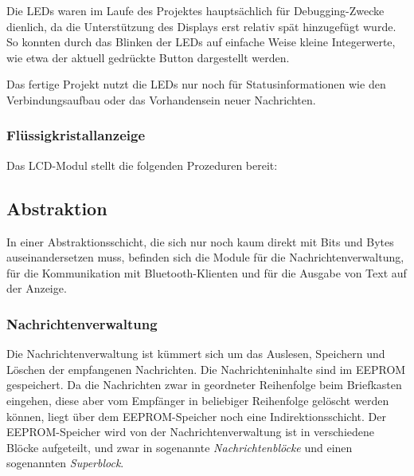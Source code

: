 \documentclass[ngerman]{article}
\begin{document}
Die LEDs waren im Laufe des Projektes hauptsächlich für Debugging-Zwecke
dienlich, da die Unterstützung des Displays erst relativ spät hinzugefügt
wurde. So konnten durch das Blinken der LEDs auf einfache Weise kleine
Integerwerte, wie etwa der aktuell gedrückte Button dargestellt werden.

Das fertige Projekt nutzt die LEDs nur noch für Statusinformationen
wie den Verbindungsaufbau oder das Vorhandensein neuer Nachrichten.

\subsubsection{Flüssigkristallanzeige}

Das LCD-Modul stellt die folgenden Prozeduren bereit:




\subsection{Abstraktion}

In einer Abstraktionsschicht, die sich nur noch kaum direkt mit Bits und Bytes
auseinandersetzen muss, befinden sich die Module für die Nachrichtenverwaltung,
für die Kommunikation mit Bluetooth-Klienten und für die Ausgabe von Text auf
der Anzeige.


\subsubsection{Nachrichtenverwaltung}

Die Nachrichtenverwaltung ist kümmert sich um das Auslesen, Speichern und
Löschen der empfangenen Nachrichten. Die Nachrichteninhalte sind im EEPROM
gespeichert.  Da die Nachrichten zwar in geordneter Reihenfolge beim
Briefkasten eingehen, diese aber vom Empfänger in beliebiger Reihenfolge
gelöscht werden können, liegt über dem EEPROM-Speicher noch eine
In\-di\-rek\-tions\-schicht. Der EEPROM-Speicher wird von der
Nachrichtenverwaltung ist in verschiedene Blöcke aufgeteilt, und zwar in
sogenannte \textit{Nachrichtenblöcke} und einen sogenannten
\textit{Superblock}.

\end{document}
